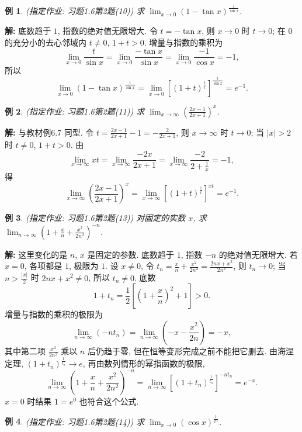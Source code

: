 \documentclass[UTF8,openany]{ctexbook}
\theoremstyle{chinesetextbook}
\newtheorem{example}{例}[section]
\newenvironment{cnsolution}{\par\indent\textbf{解:} \ignorespaces}{\par}
\begin{document}
\begin{example}
\textnormal{(指定作业: 习题1.6第2题(10))} 求 $\displaystyle\lim_{x\to0}(1-\tan x)^{\frac1{\sin x}}$.
\end{example}
\begin{cnsolution}
底数趋于 $1$, 指数的绝对值无限增大. 令 $t=-\tan x$, 则 $x\to0$ 时 $t\to0$; 在 $0$ 的充分小的去心邻域内 $t\ne0$, $1+t>0$. 增量与指数的乘积为
\[
\lim_{x\to0}\frac t{\sin x}=\lim_{x\to0}\frac{-\tan x}{\sin x}=\lim_{x\to0}\frac{-1}{\cos x}=-1,
\]
所以
\[
\lim_{x\to0}(1-\tan x)^{\frac1{\sin x}}=\lim_{x\to0}\left[(1+t)^{\frac1t}\right]^{\frac t{\sin x}}=e^{-1}.
\]
\end{cnsolution}
\begin{example}
\textnormal{(指定作业: 习题1.6第2题(11))} 求 $\displaystyle\lim_{x\to\infty}\left(\frac{2x-1}{2x+1}\right)^x$.
\end{example}
\begin{cnsolution}
与教材例6.7 同型. 令 $\displaystyle t=\frac{2x-1}{2x+1}-1=-\frac2{2x+1}$, 则 $x\to\infty$ 时 $t\to0$; 当 $|x|>2$ 时 $t\ne0$, $1+t>0$. 由
\[
\lim_{x\to\infty}xt=\lim_{x\to\infty}\frac{-2x}{2x+1}=\lim_{x\to\infty}\frac{-2}{2+\frac1x}=-1,
\]
得
\[
\lim_{x\to\infty}\left(\frac{2x-1}{2x+1}\right)^x=\lim_{x\to\infty}\left[(1+t)^{\frac1t}\right]^{xt}=e^{-1}.
\]
\end{cnsolution}
\begin{example}
\textnormal{(指定作业: 习题1.6第2题(13))} 对固定的实数 $x$, 求 $\displaystyle\lim_{n\to\infty}\left(1+\frac xn+\frac{x^2}{2n^2}\right)^{-n}$.
\end{example}
\begin{cnsolution}
这里变化的是 $n$, $x$ 是固定的参数. 底数趋于 $1$, 指数 $-n$ 的绝对值无限增大. 若 $x=0$, 各项都是 $1$, 极限为 $1$. 设 $x\ne0$, 令 $\displaystyle t_n=\frac xn+\frac{x^2}{2n^2}=\frac{2nx+x^2}{2n^2}$, 则 $t_n\to0$; 当 $\displaystyle n>\frac{|x|}2$ 时 $2nx+x^2\ne0$, 所以 $t_n\ne0$. 底数
\[
1+t_n=\frac12\left[\left(1+\frac xn\right)^2+1\right]>0.
\]
增量与指数的乘积的极限为
\[
\lim_{n\to\infty}(-nt_n)=\lim_{n\to\infty}\left(-x-\frac{x^2}{2n}\right)=-x,
\]
其中第二项 $\displaystyle\frac{x^2}{2n^2}$ 乘以 $n$ 后仍趋于零, 但在恒等变形完成之前不能把它删去. 由海涅定理, $\displaystyle(1+t_n)^{\frac1{t_n}}\to e$, 再由数列情形的幂指函数的极限,
\[
\lim_{n\to\infty}\left(1+\frac xn+\frac{x^2}{2n^2}\right)^{-n}=\lim_{n\to\infty}\left[(1+t_n)^{\frac1{t_n}}\right]^{-nt_n}=e^{-x}.
\]
$x=0$ 时结果 $1=e^0$ 也符合这个公式.
\end{cnsolution}
\begin{example}
\textnormal{(指定作业: 习题1.6第2题(14))} 求 $\displaystyle\lim_{x\to0}(\cos x)^{\frac1{x^2}}$.
\end{example}
\end{document}
